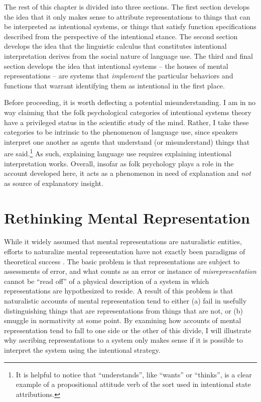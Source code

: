 The rest of this chapter is divided into three sections. The first section develops the idea that it only makes sense to attribute representations to things that can be interpreted as intentional systems, or things that satisfy function specifications described from the perspective of the intentional stance. The second section develops the idea that the linguistic calculus that constitutes intentional interpretation derives from the social nature of language use. The third and final section develops the idea that intentional systems -- the houses of mental representations -- are systems that \textit{implement} the particular behaviors and functions that warrant identifying them as intentional in the first place.    

Before proceeding, it is worth deflecting a potential misunderstanding. I am in no way claiming that the folk psychological categories of intentional systems theory have a privileged status in the scientific study of the mind. Rather, I take these categories to be intrinsic to the phenomenon of language use, since speakers interpret one another as agents that understand (or misunderstand) things that are said.\footnote{It is helpful to notice that ``understands'', like ``wants'' or ``thinks'', is a clear example of a propositional attitude verb of the sort used in intentional state attributions.} As such, explaining language use requires explaining  intentional interpretation works. Overall, insofar as folk psychology plays a role in the account developed here, it acts as a phenomenon in need of explanation and \textit{not} as source of explanatory insight. 

\section{Rethinking Mental Representation}

While it widely assumed that mental representations are naturalistic entities, efforts to naturalize mental representation have not exactly been paradigms of theoretical success \citep[][Ch. 3]{Horwich:2005}. The basic problem is that representations are subject to assessments of error, and what counts as an error or instance of \textit{misrepresentation} cannot be ``read off'' of a physical description of a system in which representations are hypothesized to reside. A result of this problem is that naturalistic accounts of mental representation tend to either (a) fail in usefully distinguishing things that are representations from things that are not, or (b) smuggle in normativity at some point. By examining how accounts of mental representation tend to fall to one side or the other of this divide, I will illustrate why ascribing representations to a system only makes sense if it is possible to interpret the system using the intentional strategy. 

